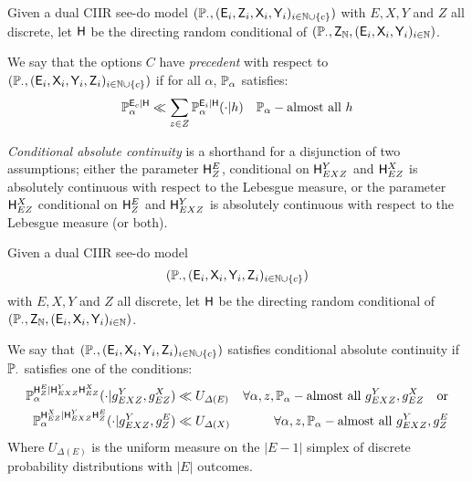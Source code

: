 \begin{definition}[Precedent]\label{def:precedent}
Given a dual CIIR see-do model $(\mathbb{P}_\cdot,(\mathsf{E}_i,\mathsf{Z}_i,\mathsf{X}_i,\mathsf{Y}_i)_{i\in\mathbb{N}\cup\{c\}})$ with $E,X,Y$ and $Z$ all discrete, let $\mathsf{H}$ be the directing random conditional of $(\mathbb{P}_\cdot,\mathsf{Z}_{\mathbb{N}},(\mathsf{E}_i,\mathsf{X}_i,\mathsf{Y}_i)_{i\in \mathbb{N}})$. 

We say that the options $C$ have \emph{precedent} with respect to $(\mathbb{P}_\cdot,(\mathsf{E}_i,\mathsf{X}_i,\mathsf{Y}_i,\mathsf{Z}_i)_{i\in\mathbb{N}\cup\{c\}})$ if for all $\alpha$, $\mathbb{P}_\alpha$ satisfies:
\begin{align}
    \mathbb{P}_\alpha^{\mathsf{E}_c|\mathsf{H}} &\ll \sum_{z\in Z}\mathbb{P}_\alpha^{\mathsf{E}_i|\mathsf{H}}(\cdot|h)&\mathbb{P}_\alpha-\text{almost all }h
\end{align}
\end{definition}

\emph{Conditional absolute continuity} is a shorthand for a disjunction of two assumptions; either the parameter $\mathsf{H}^E_Z$, conditional on $\mathsf{H}^Y_{EXZ}$ and $\mathsf{H}^X_{EZ}$ is absolutely continuous with respect to the Lebesgue measure, or the parameter $\mathsf{H}^{X}_{EZ}$ conditional on $\mathsf{H}^E_Z$ and $\mathsf{H}^Y_{EXZ}$ is absolutely continuous with respect to the Lebesgue measure (or both). 

\begin{definition}\label{def:absolute_continuity}
Given a dual CIIR see-do model $$(\mathbb{P}_\cdot,(\mathsf{E}_i,\mathsf{X}_i,\mathsf{Y}_i,\mathsf{Z}_i)_{i\in\mathbb{N}\cup\{c\}})$$ with $E,X,Y$ and $Z$ all discrete, let $\mathsf{H}$ be the directing random conditional of $(\mathbb{P}_\cdot,\mathsf{Z}_{\mathbb{N}},(\mathsf{E}_i,\mathsf{X}_i,\mathsf{Y}_i)_{i\in \mathbb{N}})$. 

We say that $(\mathbb{P}_\cdot,(\mathsf{E}_i,\mathsf{X}_i,\mathsf{Y}_i,\mathsf{Z}_i)_{i\in\mathbb{N}\cup\{c\}})$ satisfies conditional absolute continuity if $\mathbb{P}_\cdot$ satisfies one of the conditions:
\begin{align}
    \mathbb{P}_{\alpha}^{\mathsf{H}^{E}_{Z}|\mathsf{H}^{Y}_{EXZ}\mathsf{H}^X_{EZ}}(\cdot|g^{Y}_{EXZ}, g^X_{EZ}) &\ll U_{\Delta(E)}& \forall \alpha, z, \mathbb{P}_\alpha-\text{almost all }g^{Y}_{EXZ}, g^X_{EZ} \quad \text{or}\\
    \mathbb{P}_{\alpha}^{\mathsf{H}^X_{EZ}|\mathsf{H}^{Y}_{EXZ}\mathsf{H}^{E}_{Z}}(\cdot|g^{Y}_{EXZ}, g^E_Z) &\ll U_{\Delta(X)}& \forall \alpha, z, \mathbb{P}_\alpha-\text{almost all }g^{Y}_{EXZ}, g^E_Z\label{eqApp:lebesgue_dom}
\end{align}
Where $U_{\Delta(E)}$ is the uniform measure on the $|E-1|$ simplex of discrete probability distributions with $|E|$ outcomes.
\end{definition}

